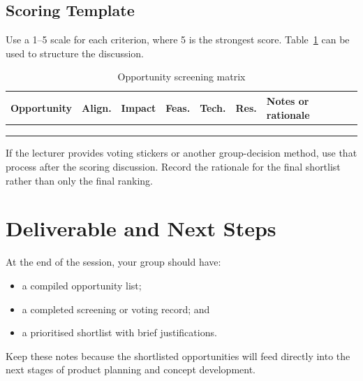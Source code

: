 \subsection{Scoring Template}

Use a 1--5 scale for each criterion, where 5 is the strongest score. Table~\ref{tab:session4-screening-matrix} can be used to structure the discussion.

\begin{table}[htbp]
\centering
\caption{Opportunity screening matrix}
\label{tab:session4-screening-matrix}
\renewcommand{\arraystretch}{1.2}
\begin{tabularx}{\textwidth}{|>{\raggedright\arraybackslash}X|c|c|c|c|c|>{\raggedright\arraybackslash}p{}|}
\hline
\textbf{Opportunity} & \textbf{Align.} & \textbf{Impact} & \textbf{Feas.} & \textbf{Tech.} & \textbf{Res.} & \textbf{Notes or rationale} \\
\hline
 &  &  &  &  &  &  \\
\hline
 &  &  &  &  &  &  \\
\hline
 &  &  &  &  &  &  \\
\hline
\end{tabularx}
\end{table}

If the lecturer provides voting stickers or another group-decision method, use that process after the scoring discussion. Record the rationale for the final shortlist rather than only the final ranking.

\section{Deliverable and Next Steps}

At the end of the session, your group should have:
\begin{itemize}
    \item a compiled opportunity list;
    \item a completed screening or voting record; and
    \item a prioritised shortlist with brief justifications.
\end{itemize}

Keep these notes because the shortlisted opportunities will feed directly into the next stages of product planning and concept development.
